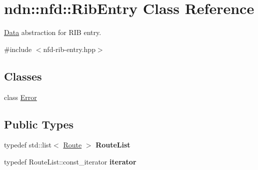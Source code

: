 \hypertarget{classndn_1_1nfd_1_1RibEntry}{}\section{ndn\+:\+:nfd\+:\+:Rib\+Entry Class Reference}
\label{classndn_1_1nfd_1_1RibEntry}


\hyperlink{classndn_1_1Data}{Data} abstraction for R\+IB entry.  




{\ttfamily \#include $<$nfd-\/rib-\/entry.\+hpp$>$}

\subsection*{Classes}
\begin{DoxyCompactItemize}
\item 
class \hyperlink{classndn_1_1nfd_1_1RibEntry_1_1Error}{Error}
\end{DoxyCompactItemize}
\subsection*{Public Types}
\begin{DoxyCompactItemize}
\item 
typedef std\+::list$<$ \hyperlink{classndn_1_1nfd_1_1Route}{Route} $>$ {\bfseries Route\+List}\hypertarget{classndn_1_1nfd_1_1RibEntry_a42acc595283fe902a3ba85e934db2f2b}{}\label{classndn_1_1nfd_1_1RibEntry_a42acc595283fe902a3ba85e934db2f2b}

\item 
typedef Route\+List\+::const\+\_\+iterator {\bfseries iterator}\hypertarget{classndn_1_1nfd_1_1RibEntry_a4c99dbeca0ccec5254a010edebbf48a3}{}\label{classndn_1_1nfd_1_1RibEntry_a4c99dbeca0ccec5254a010edebbf48a3}

\end{DoxyCompactItemize}
